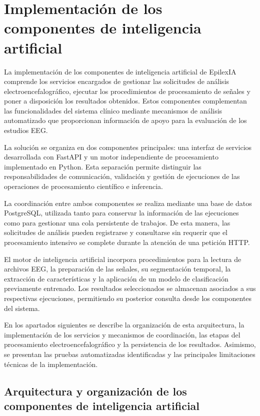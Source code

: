 \section{Implementación de los componentes de inteligencia artificial}

La implementación de los componentes de inteligencia artificial
de EpilexIA comprende los servicios encargados de gestionar
las solicitudes de análisis electroencefalográfico, ejecutar
los procedimientos de procesamiento de señales y poner a
disposición los resultados obtenidos. Estos componentes
complementan las funcionalidades del sistema clínico mediante
mecanismos de análisis automatizado que proporcionan
información de apoyo para la evaluación de los estudios EEG.

La solución se organiza en dos componentes principales:
una interfaz de servicios desarrollada con FastAPI y un
motor independiente de procesamiento implementado en Python.
Esta separación permite distinguir las responsabilidades
de comunicación, validación y gestión de ejecuciones de
las operaciones de procesamiento científico e inferencia.

La coordinación entre ambos componentes se realiza mediante
una base de datos PostgreSQL, utilizada tanto para conservar
la información de las ejecuciones como para gestionar una
cola persistente de trabajos. De esta manera, las solicitudes
de análisis pueden registrarse y consultarse sin requerir
que el procesamiento intensivo se complete durante la
atención de una petición HTTP.

El motor de inteligencia artificial incorpora procedimientos
para la lectura de archivos EEG, la preparación de las señales,
su segmentación temporal, la extracción de características
y la aplicación de un modelo de clasificación previamente
entrenado. Los resultados seleccionados se almacenan
asociados a sus respectivas ejecuciones, permitiendo su
posterior consulta desde los componentes del sistema.

En los apartados siguientes se describe la organización
de esta arquitectura, la implementación de los servicios
y mecanismos de coordinación, las etapas del procesamiento
electroencefalográfico y la persistencia de los resultados.
Asimismo, se presentan las pruebas automatizadas
identificadas y las principales limitaciones técnicas
de la implementación.


\subsection{Arquitectura y organización de los componentes de inteligencia artificial}

